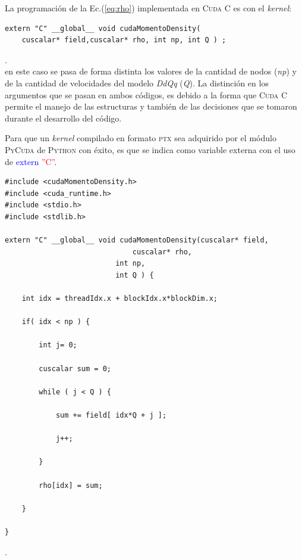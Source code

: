 La programación de la Ec.(\ref{eq:rho}) implementada en \textsc{Cuda C} es con el \textit{kernel}:

{\footnotesize
	\begin{frame}{}
		\begin{lstlisting}
extern "C" __global__ void cudaMomentoDensity(
	cuscalar* field,cuscalar* rho, int np, int Q ) ; 
		\end{lstlisting}
		
	\end{frame}
}.
\\
en este caso se pasa de forma distinta los valores de la cantidad de nodos (\textit{np}) y de la cantidad de velocidades del modelo \textit{DdQq} (\textit{Q}). La distinción en los argumentos que se pasan en ambos códigos, es debido a la forma que \textsc{Cuda C} permite el manejo de las estructuras y también de las decisiones que se tomaron durante el desarrollo del código.

Para que un \textit{kernel} compilado en formato \textsc{ptx} sea adquirido por el módulo \textsc{PyCuda} de \textsc{Python} con éxito, es que se indica como variable externa con el uso de \textcolor{blue}{extern} \textcolor{red}{''C''}.

\newpage

{\footnotesize
	\begin{frame}{}
		\begin{lstlisting}[frame=single]
#include <cudaMomentoDensity.h>
#include <cuda_runtime.h>
#include <stdio.h>
#include <stdlib.h>

extern "C" __global__ void cudaMomentoDensity(cuscalar* field,
				              cuscalar* rho,
					      int np,
					      int Q ) {
							
	int idx = threadIdx.x + blockIdx.x*blockDim.x;	
	
	if( idx < np ) {	
	
		int j= 0;		
	
		cuscalar sum = 0;		
	
		while ( j < Q ) {		
	
			sum += field[ idx*Q + j ];			
	
			j++;			
	
		}				
	
		rho[idx] = sum;	
	
	}
	
}		
		\end{lstlisting}
		
	\end{frame}
}.
\\

